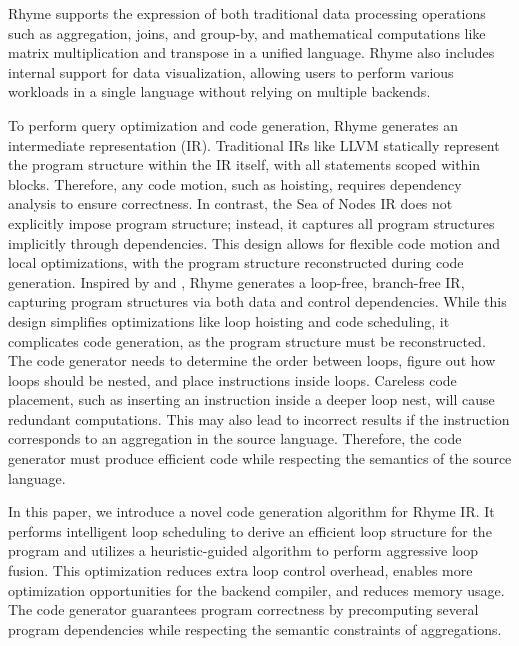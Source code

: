 \documentclass[sigplan, nonacm]{acmart}\settopmatter{printfolios=true,printccs=false,printacmref=false}
\begin{document}
Rhyme supports the expression of both traditional data processing operations such as aggregation, joins, and group-by, and mathematical computations like matrix multiplication and transpose in a unified language. Rhyme also includes internal support for data visualization, allowing users to perform various workloads in a single language without relying on multiple backends.

To perform query optimization and code generation, Rhyme generates an intermediate representation (IR). Traditional IRs like LLVM \cite{lattner2004llvm} statically represent the program structure within the IR itself, with all statements scoped within blocks. Therefore, any code motion, such as hoisting, requires dependency analysis to ensure correctness. In contrast, the Sea of Nodes IR \cite{hotspot} does not explicitly impose program structure; instead, it captures all program structures implicitly through dependencies. This design allows for flexible code motion and local optimizations, with the program structure reconstructed during code generation. Inspired by \cite{rompf2010lightweight} and \cite{bravcevac2023graph}, Rhyme generates a loop-free, branch-free IR, capturing program structures via both data and control dependencies. While this design simplifies optimizations like loop hoisting and code scheduling, it complicates code generation, as the program structure must be reconstructed. The code generator needs to determine the order between loops, figure out how loops should be nested, and place instructions inside loops. Careless code placement, such as inserting an instruction inside a deeper loop nest, will cause redundant computations. This may also lead to incorrect results if the instruction corresponds to an aggregation in the source language. Therefore, the code generator must produce efficient code while respecting the semantics of the source language.\par

In this paper, we introduce a novel code generation algorithm for Rhyme IR. It performs intelligent loop scheduling to derive an efficient loop structure for the program and utilizes a heuristic-guided algorithm to perform aggressive loop fusion. This optimization reduces extra loop control overhead, enables more optimization opportunities for the backend compiler, and reduces memory usage. The code generator guarantees program correctness by precomputing several program dependencies while respecting the semantic constraints of aggregations.
\end{document}
